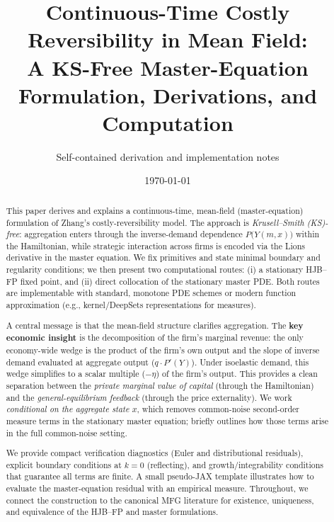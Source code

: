 \documentclass[11pt,letterpaper,oneside]{article}
\title{\vspace{-1.5em}Continuous-Time Costly Reversibility in Mean Field:\\
A KS-Free Master-Equation Formulation, Derivations, and Computation}
\author{%
\small Self-contained derivation and implementation notes
}
\date{\small \today}
\numberwithin{equation}{section}
\newcommand{\ac}[1]{{\mdseries\textsc{#1}}}
\newcommand{\1}{\mathbf{1}}
\begin{document}
\maketitle

\begin{abstract}
\noindent
This paper derives and explains a continuous-time, mean-field (master-equation) formulation of Zhang's costly-reversibility model. The approach is \emph{Krusell--Smith (KS)-free}: aggregation enters through the inverse-demand dependence $P\big(Y(m,x)\big)$ within the Hamiltonian, while strategic interaction across firms is encoded via the Lions derivative in the master equation. We fix primitives and state minimal boundary and regularity conditions; we then present two computational routes: (i) a stationary \ac{HJB}--\ac{FP} fixed point, and (ii) direct collocation of the stationary master \ac{PDE}. Both routes are implementable with standard, monotone PDE schemes or modern function approximation (e.g., kernel/DeepSets representations for measures).

A central message is that the mean-field structure clarifies aggregation. The \textbf{key economic insight} is the decomposition of the firm's marginal revenue: the only economy-wide wedge is the product of the firm's own output and the slope of inverse demand evaluated at aggregate output ($q\cdot P'(Y)$). Under isoelastic demand, this wedge simplifies to a scalar multiple ($-\eta$) of the firm's output. This provides a clean separation between the \emph{private marginal value of capital} (through the Hamiltonian) and the \emph{general-equilibrium feedback} (through the price externality). We work \emph{conditional on the aggregate state $x$}, which removes common-noise second-order measure terms in the stationary master equation;  briefly outlines how those terms arise in the full common-noise setting.

We provide compact verification diagnostics (Euler and distributional residuals), explicit boundary conditions at $k=0$ (reflecting), and growth/integrability conditions that guarantee all terms are finite. A small pseudo-JAX template illustrates how to evaluate the master-equation residual with an empirical measure. Throughout, we connect the construction to the canonical \ac{MFG} literature for existence, uniqueness, and equivalence of the \ac{HJB}--\ac{FP} and master formulations.
\end{abstract}

\tableofcontents
\end{document}
